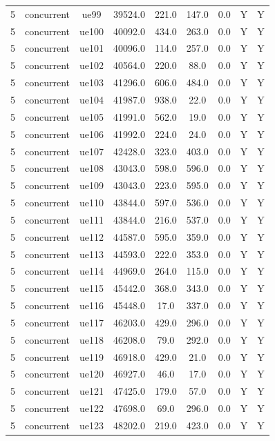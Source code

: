 \begin{table}[ht]
\begin{tabular}{|c|c|c|c|c|c|c|c|c|}
5 & concurrent & ue99 & 39524.0 & 221.0 & 147.0 & 0.0 & Y & Y \\
5 & concurrent & ue100 & 40092.0 & 434.0 & 263.0 & 0.0 & Y & Y \\
5 & concurrent & ue101 & 40096.0 & 114.0 & 257.0 & 0.0 & Y & Y \\
5 & concurrent & ue102 & 40564.0 & 220.0 & 88.0 & 0.0 & Y & Y \\
5 & concurrent & ue103 & 41296.0 & 606.0 & 484.0 & 0.0 & Y & Y \\
5 & concurrent & ue104 & 41987.0 & 938.0 & 22.0 & 0.0 & Y & Y \\
5 & concurrent & ue105 & 41991.0 & 562.0 & 19.0 & 0.0 & Y & Y \\
5 & concurrent & ue106 & 41992.0 & 224.0 & 24.0 & 0.0 & Y & Y \\
5 & concurrent & ue107 & 42428.0 & 323.0 & 403.0 & 0.0 & Y & Y \\
5 & concurrent & ue108 & 43043.0 & 598.0 & 596.0 & 0.0 & Y & Y \\
5 & concurrent & ue109 & 43043.0 & 223.0 & 595.0 & 0.0 & Y & Y \\
5 & concurrent & ue110 & 43844.0 & 597.0 & 536.0 & 0.0 & Y & Y \\
5 & concurrent & ue111 & 43844.0 & 216.0 & 537.0 & 0.0 & Y & Y \\
5 & concurrent & ue112 & 44587.0 & 595.0 & 359.0 & 0.0 & Y & Y \\
5 & concurrent & ue113 & 44593.0 & 222.0 & 353.0 & 0.0 & Y & Y \\
5 & concurrent & ue114 & 44969.0 & 264.0 & 115.0 & 0.0 & Y & Y \\
5 & concurrent & ue115 & 45442.0 & 368.0 & 343.0 & 0.0 & Y & Y \\
5 & concurrent & ue116 & 45448.0 & 17.0 & 337.0 & 0.0 & Y & Y \\
5 & concurrent & ue117 & 46203.0 & 429.0 & 296.0 & 0.0 & Y & Y \\
5 & concurrent & ue118 & 46208.0 & 79.0 & 292.0 & 0.0 & Y & Y \\
5 & concurrent & ue119 & 46918.0 & 429.0 & 21.0 & 0.0 & Y & Y \\
5 & concurrent & ue120 & 46927.0 & 46.0 & 17.0 & 0.0 & Y & Y \\
5 & concurrent & ue121 & 47425.0 & 179.0 & 57.0 & 0.0 & Y & Y \\
5 & concurrent & ue122 & 47698.0 & 69.0 & 296.0 & 0.0 & Y & Y \\
5 & concurrent & ue123 & 48202.0 & 219.0 & 423.0 & 0.0 & Y & Y \\

\end{tabular}
\end{table}
